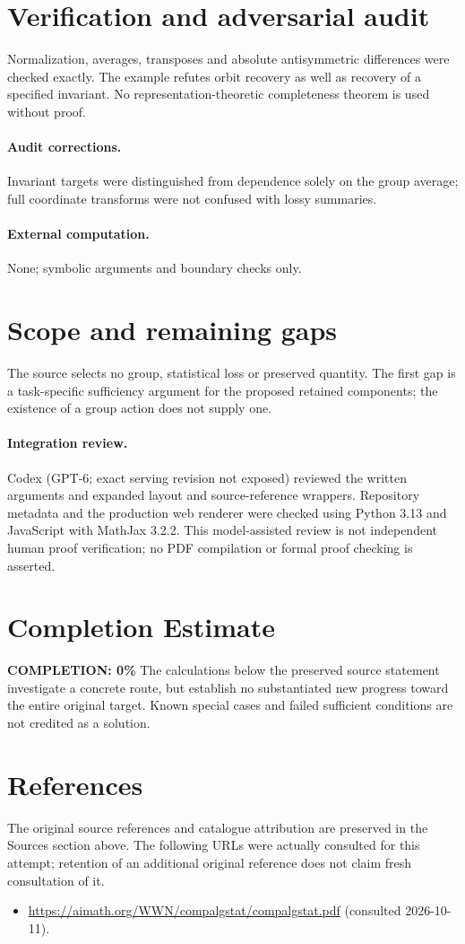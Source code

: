 \documentclass[11pt]{article}
\begin{document}
\section{Verification and adversarial audit}
Normalization, averages, transposes and absolute antisymmetric differences
were checked exactly. The example refutes orbit recovery as well as recovery
of a specified invariant. No representation-theoretic completeness theorem is
used without proof.
\paragraph{Audit corrections.} Invariant targets were distinguished from dependence solely on the group average; full coordinate transforms were not confused with lossy summaries.
\paragraph{External computation.} None; symbolic arguments and boundary checks only.
\section{Scope and remaining gaps}
The source selects no group, statistical loss or preserved quantity. The
first gap is a task-specific sufficiency argument for the proposed retained
components; the existence of a group action does not supply one.
\paragraph{Integration review.} Codex (GPT-6; exact serving revision not exposed) reviewed the written arguments and expanded layout and source-reference wrappers. Repository metadata and the production web renderer were checked using Python 3.13 and JavaScript with MathJax 3.2.2. This model-assisted review is not independent human proof verification; no PDF compilation or formal proof checking is asserted.

\section{Completion Estimate}
\noindent\textbf{COMPLETION: 0\%}
The calculations below the preserved source statement investigate a concrete route,
but establish no substantiated new progress toward the entire original target.
Known special cases and failed sufficient conditions are not credited as a solution.
\section{References}
The original source references and catalogue attribution are preserved in the
Sources section above. The following URLs were actually consulted for this attempt;
retention of an additional original reference does not claim fresh consultation of it.
\begin{itemize}
\item \url{https://aimath.org/WWN/compalgstat/compalgstat.pdf} (consulted 2026-10-11). 
\end{itemize}
\end{document}
